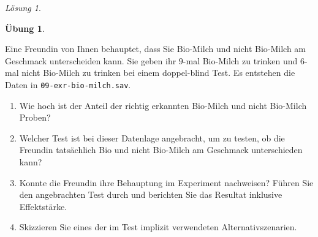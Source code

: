 \documentclass[
]{book}
\providecommand{\tightlist}{%
  \setlength{\itemsep}{0pt}\setlength{\parskip}{0pt}}
\theoremstyle{definition}
\theoremstyle{definition}
\theoremstyle{definition}
\newtheorem{exercise}{Übung}[chapter]
\theoremstyle{definition}
\theoremstyle{remark}
\newtheorem*{solution}{Lösung}
\begin{document}
\begin{solution}
\end{solution}

\begin{exercise}
\protect\hypertarget{exr:bio-milch}{}\label{exr:bio-milch}\leavevmode

Eine Freundin von Ihnen behauptet, dass Sie Bio-Milch und nicht
Bio-Milch am Geschmack unterscheiden kann. Sie geben ihr \(9\)-mal
Bio-Milch zu trinken und \(6\)-mal nicht Bio-Milch zu trinken bei einem
doppel-blind Test. Es entstehen die Daten in
\texttt{09-exr-bio-milch.sav}.

\begin{enumerate}
\def\labelenumi{\alph{enumi})}
\tightlist
\item
  Wie hoch ist der Anteil der richtig erkannten Bio-Milch und nicht Bio-Milch Proben?
\item
  Welcher Test ist bei dieser Datenlage angebracht, um zu testen, ob
  die Freundin tatsächlich Bio und nicht Bio-Milch am Geschmack
  unterschieden kann?
\item
  Konnte die Freundin ihre Behauptung im Experiment nachweisen? Führen
  Sie den angebrachten Test durch und berichten Sie das Resultat
  inklusive Effektstärke.
\item
  Skizzieren Sie eines der im Test implizit verwendeten Alternativszenarien.
\end{enumerate}

\end{exercise}
\end{document}
